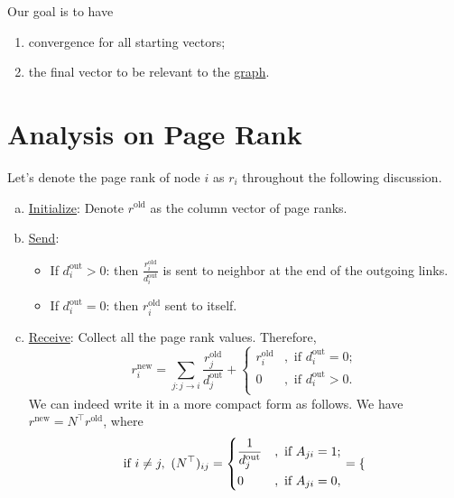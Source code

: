 Our goal is to have
\begin{enumerate}
	\item convergence for all starting vectors;
	\item the final vector to be relevant to the \hyperref[def:graph]{graph}.
\end{enumerate}

\section{Analysis on Page Rank}
Let's denote the page rank of node \(i\) as \(r_i\) throughout the following discussion.
\begin{enumerate}[(a)]
	\item \hyperref[algo:basic-page-rank-algorithm:initialize]{Initialize}: Denote \(r^{\text{old}}\) as the column vector of page ranks.
	\item \hyperref[algo:basic-page-rank-algorithm:send]{Send}:
	      \begin{itemize}
		      \item If \(d^{\text{out}}_i > 0\): then \(\frac{r_{i}^{\text{old}}}{d_{i}^{\text{out}}}\) is sent to neighbor at the end of the outgoing links.
		      \item If \(d_{i}^{\text{out}} = 0\): then \(r_{i}^{\text{old}}\) sent to itself.
	      \end{itemize}
	\item \hyperref[algo:basic-page-rank-algorithm:receive]{Receive}: Collect all the page rank values. Therefore,
	      \[
		      r_{i}^{\text{new}} = \sum\limits_{j:j\to i}\frac{r_{j}^{\text{old}}}{d_{j}^{\text{out}}}+\begin{cases}
			      r_{i}^{\text{old}} & , \text{ if }d_{i}^{\text{out}} = 0; \\
			      0                  & , \text{ if }d_{i}^{\text{out}} > 0. \\
		      \end{cases}
	      \]
	      We can indeed write it in a more compact form as follows. We have \(r^{\text{new}} = N^{\top} r^{\text{old}}\), where
	      \[
		      \begin{alignedat}{3}
			      &\text{if }i\neq  j,\ (N^{\top})_{ij} = \begin{dcases}
				      \frac{1}{d_{j}^{\text{out}}} & , \text{ if } A_{ji} = 1; \\
				      0                            & , \text{ if } A_{ji} = 0, \\
			      \end{dcases} &&= \begin{dcases}

\end{dcases}
\end{alignedat}\]
\end{enumerate}

